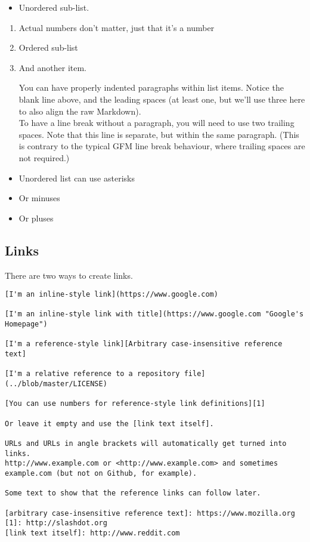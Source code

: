 \documentclass[a4paper, 11pt]{gfm}
\begin{document}
\begin{itemize}
  \item Unordered sub-list.
\end{itemize}

\begin{enumerate}
  \item Actual numbers don't matter, just that it's a number
  \item Ordered sub-list
  \item And another item.
	
	You can have properly indented paragraphs within list items. Notice the blank line above, and the leading spaces (at least one, but we'll use three here to also align the raw Markdown).\\
	
	To have a line break without a paragraph, you will need to use two trailing spaces.
Note that this line is separate, but within the same paragraph.
(This is contrary to the typical GFM line break behaviour, where trailing spaces are not required.)
\end{enumerate}

\begin{itemize}
	\item Unordered list can use asterisks
	\item Or minuses
	\item Or pluses
\end{itemize}

\subsection{Links}

There are two ways to create links.

\begin{lstlisting}
[I'm an inline-style link](https://www.google.com)

[I'm an inline-style link with title](https://www.google.com "Google's Homepage")

[I'm a reference-style link][Arbitrary case-insensitive reference text]

[I'm a relative reference to a repository file](../blob/master/LICENSE)

[You can use numbers for reference-style link definitions][1]

Or leave it empty and use the [link text itself].

URLs and URLs in angle brackets will automatically get turned into links. 
http://www.example.com or <http://www.example.com> and sometimes 
example.com (but not on Github, for example).

Some text to show that the reference links can follow later.

[arbitrary case-insensitive reference text]: https://www.mozilla.org
[1]: http://slashdot.org
[link text itself]: http://www.reddit.com
\end{lstlisting}
\end{document}
